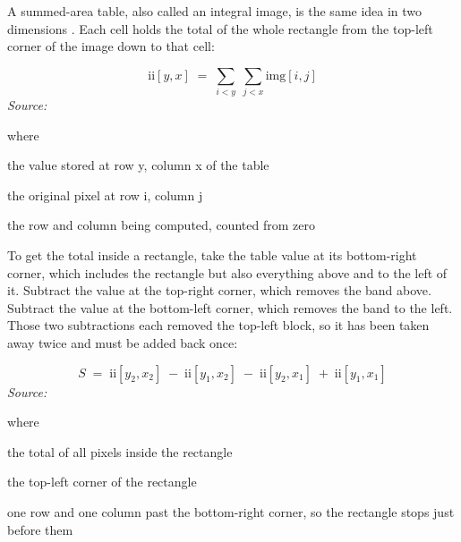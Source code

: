 A summed-area table, also called an integral image, is the same idea in two dimensions \cite{crow1984}. Each cell holds the total of the whole rectangle from the top-left corner of the image down to that cell:


\begin{equation}
\mathrm{ii}[y,x] \;=\; \sum_{i<y}\;\sum_{j<x} \mathrm{img}[i,j]
\end{equation}
\noindent\emph{Source: }\cite{crow1984}


\noindent where
\begin{description}[leftmargin=2.4em,style=nextline,font=\normalfont\ttfamily]\setlength\itemsep{1pt}
  \item[{$\mathrm{ii}[y,x]$}] \normalfont the value stored at row y, column x of the table
  \item[{$\mathrm{img}[i,j]$}] \normalfont the original pixel at row i, column j
  \item[{$y, x$}] \normalfont the row and column being computed, counted from zero
\end{description}

To get the total inside a rectangle, take the table value at its bottom-right corner, which includes the rectangle but also everything above and to the left of it. Subtract the value at the top-right corner, which removes the band above. Subtract the value at the bottom-left corner, which removes the band to the left. Those two subtractions each removed the top-left block, so it has been taken away twice and must be added back once:


\begin{equation}
S \;=\; \mathrm{ii}[y_2,x_2] \;-\; \mathrm{ii}[y_1,x_2]\;-\; \mathrm{ii}[y_2,x_1] \;+\; \mathrm{ii}[y_1,x_1]
\end{equation}
\noindent\emph{Source: }\cite{crow1984}


\noindent where
\begin{description}[leftmargin=2.4em,style=nextline,font=\normalfont\ttfamily]\setlength\itemsep{1pt}
  \item[{$S$}] \normalfont the total of all pixels inside the rectangle
  \item[{$y_1, x_1$}] \normalfont the top-left corner of the rectangle
  \item[{$y_2, x_2$}] \normalfont one row and one column past the bottom-right corner, so the rectangle stops just before them
\end{description}

